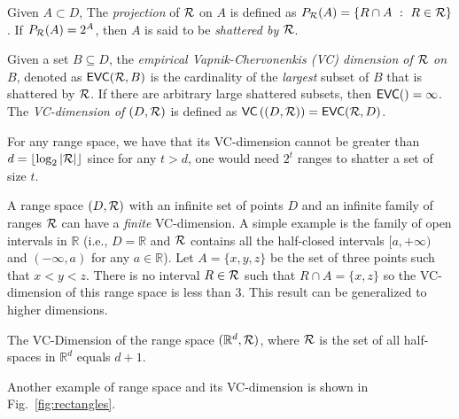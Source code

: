 Given $A\subset D$, The {\em projection} of $\mathcal{R}$ on $A$ is defined as
$P_{\mathcal{R}}(A)=\{R\cap A ~:~ R\in\mathcal{R}\}$. If $P_{\mathcal{R}}(A)=2^A$, then $A$ is said
to be {\em shattered by $\mathcal{R}$}. 

\begin{definition}\label{def:vcdim}
  Given a set $B\subseteq D$, the \emph{empirical Vapnik-Chervonenkis (VC)
  dimension of $\mathcal{R}$ on $B$}, denoted as $\mathsf{EVC}(\mathcal{R},B)$ is the
  cardinality of the \emph{largest} subset of $B$ that is shattered by $\mathcal{R}$. If
  there are arbitrary large shattered subsets, then $\mathsf{EVC}()=\infty$. The
  \emph{VC-dimension of $(D,\mathcal{R})$} is defined as
  $\mathsf{VC}\left((D,\mathcal{R})\right)=\mathsf{EVC}(\mathcal{R},D)$.
\end{definition}

For any range space, we have that its VC-dimension cannot be greater than
$d=\lfloor\log_2|\mathcal{R}|\rfloor$ since for any $t>d$, one would need $2^t$
ranges to shatter a set of size $t$. 

A range space $(D,\mathcal{R})$ with an infinite set of points $D$ and
an infinite family of ranges $\mathcal{R}$ can have a \emph{finite} VC-dimension. A simple
example is the family of open intervals in $\mathbb{R}$ (i.e., $D=\mathbb{R}$ and $\mathcal{R}$
contains all the half-closed intervals $[a,+\infty)$ and $(-\infty, a)$ for any
$a\in\mathbb{R}$). Let $A=\{x,y,z\}$ be the set of three points such that
$x<y<z$. There is no interval $R\in\mathcal{R}$ such that $R\cap A=\{x,z\}$ so the
VC-dimension of this range space is less than 3. This result can be generalized
to higher dimensions.  
\begin{lemma}\label{lem:matousek} The
  VC-Dimension of the range
  space $(\mathbb{R}^d, \mathcal{R})$, where $\mathcal{R}$ is the set of all half-spaces
  in $\mathbb{R}^d$ equals $d+1$.
\end{lemma}
Another example of range space and its VC-dimension is shown in Fig.~\ref{fig:rectangles}.


